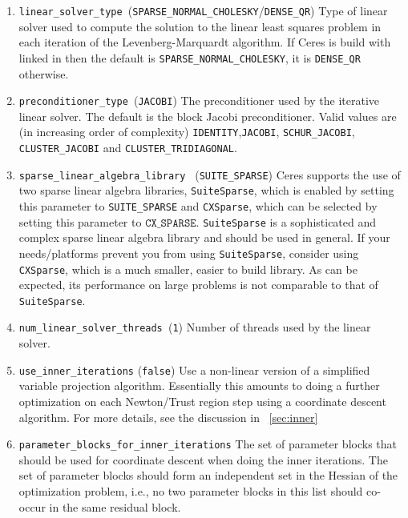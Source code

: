 \begin{enumerate}
\item{\texttt{linear\_solver\_type
    }}(\texttt{SPARSE\_NORMAL\_CHOLESKY}/\texttt{DENSE\_QR}) Type of
  linear solver used to compute the solution to the linear least
  squares problem in each iteration of the Levenberg-Marquardt
  algorithm. If Ceres is build with \suitesparse linked in  then the
  default is \texttt{SPARSE\_NORMAL\_CHOLESKY}, it is
  \texttt{DENSE\_QR} otherwise.

\item{\texttt{preconditioner\_type }}(\texttt{JACOBI}) The
  preconditioner used by the iterative linear solver. The default is
  the block Jacobi preconditioner. Valid values are (in increasing
  order of complexity) \texttt{IDENTITY},\texttt{JACOBI},
  \texttt{SCHUR\_JACOBI}, \texttt{CLUSTER\_JACOBI} and
  \texttt{CLUSTER\_TRIDIAGONAL}.

\item{\texttt{sparse\_linear\_algebra\_library }
    (\texttt{SUITE\_SPARSE})} Ceres supports the use of two sparse
  linear algebra libraries, \texttt{SuiteSparse}, which is enabled by
  setting this parameter to \texttt{SUITE\_SPARSE} and
  \texttt{CXSparse}, which can be selected by setting this parameter
  to $\texttt{CX\_SPARSE}$. \texttt{SuiteSparse} is a sophisticated
  and complex sparse linear algebra library and should be used in
  general. If your needs/platforms prevent you from using
  \texttt{SuiteSparse}, consider using \texttt{CXSparse}, which is a
  much smaller, easier to build library. As can be expected, its
  performance on large problems is not comparable to that of
  \texttt{SuiteSparse}.


\item{\texttt{num\_linear\_solver\_threads }}(\texttt{1}) Number of
  threads used by the linear solver.

\item{\texttt{use\_inner\_iterations} (\texttt{false}) } Use a
  non-linear version of a simplified variable projection
  algorithm. Essentially this amounts to doing a further optimization
  on each Newton/Trust region step using a coordinate descent
  algorithm.  For more details, see the discussion in ~\ref{sec:inner}

\item{\texttt{parameter\_blocks\_for\_inner\_iterations} } The set of
  parameter blocks that should be used for coordinate descent when
  doing the inner iterations. The set of parameter blocks should form
  an independent set in the Hessian of the optimization problem, i.e.,
  no two parameter blocks in this list should co-occur in the same
  residual block.


\end{enumerate}
